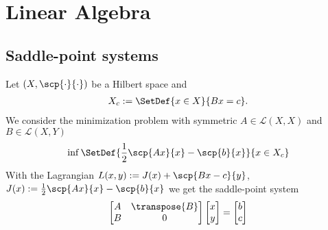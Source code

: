 %
\section{Linear Algebra}\label{sec:}
%
%
\subsection{Saddle-point systems}\label{subsec:}
%
Let $(X,\scp{\cdot}{\cdot})$ be a Hilbert space and 
%
\begin{align*}
X_c := \SetDef{x\in X}{Bx = c}.
\end{align*}
%
We consider the minimization problem with symmetric $A\in \mathcal L(X,X)$ and $B\in \mathcal L(X,Y)$
%
\begin{equation}\label{eq:}
\inf\SetDef{\frac12\scp{Ax}{x}-\scp{b}{x}}{x \in X_c}
\end{equation}
%
With the Lagrangian $L(x,y):= J(x)+ \scp{Bx-c}{y}$, $J(x) :=\frac12\scp{Ax}{x}-\scp{b}{x} $ we get the saddle-point system
%
\begin{equation}\label{eq:SaddlePoint}
\begin{bmatrix}
A & \transpose{B}\\
B & 0
\end{bmatrix}
\begin{bmatrix}
x\\y
\end{bmatrix}
=
\begin{bmatrix}
b\\c
\end{bmatrix}
\end{equation}
%
%

